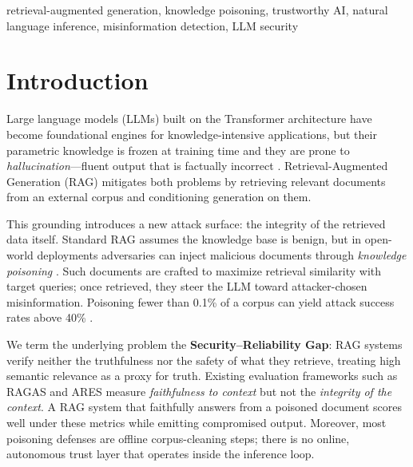 \documentclass[conference]{IEEEtran}
\begin{document}
\begin{IEEEkeywords}
retrieval-augmented generation, knowledge poisoning, trustworthy AI, natural
language inference, misinformation detection, LLM security
\end{IEEEkeywords}

\section{Introduction}
Large language models (LLMs) built on the Transformer architecture
\cite{vaswani2017attention} have become foundational engines for
knowledge-intensive applications, but their parametric knowledge is frozen at
training time and they are prone to \emph{hallucination}---fluent output that is
factually incorrect \cite{ji2023survey}. Retrieval-Augmented Generation (RAG)
\cite{lewis2020rag} mitigates both problems by retrieving relevant documents
from an external corpus and conditioning generation on them.

This grounding introduces a new attack surface: the integrity of the retrieved
data itself. Standard RAG assumes the knowledge base is benign, but in
open-world deployments adversaries can inject malicious documents through
\emph{knowledge poisoning} \cite{zou2024poisoned}. Such documents are crafted to
maximize retrieval similarity with target queries; once retrieved, they steer
the LLM toward attacker-chosen misinformation. Poisoning fewer than 0.1\% of a
corpus can yield attack success rates above 40\% \cite{zou2024poisoned}.

We term the underlying problem the \textbf{Security--Reliability Gap}: RAG
systems verify neither the truthfulness nor the safety of what they retrieve,
treating high semantic relevance as a proxy for truth. Existing evaluation
frameworks such as RAGAS \cite{es2024ragas} and ARES \cite{saadfalcon2024ares}
measure \emph{faithfulness to context} but not the \emph{integrity of the
context}. A RAG system that faithfully answers from a poisoned document scores
well under these metrics while emitting compromised output. Moreover, most
poisoning defenses are offline corpus-cleaning steps; there is no online,
autonomous trust layer that operates inside the inference loop.
\end{document}
